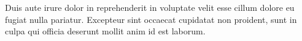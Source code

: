 Duis aute irure dolor in reprehenderit in voluptate velit esse cillum dolore eu fugiat nulla pariatur. Excepteur sint occaecat cupidatat non proident, sunt in culpa qui officia deserunt mollit anim id est laborum. 


